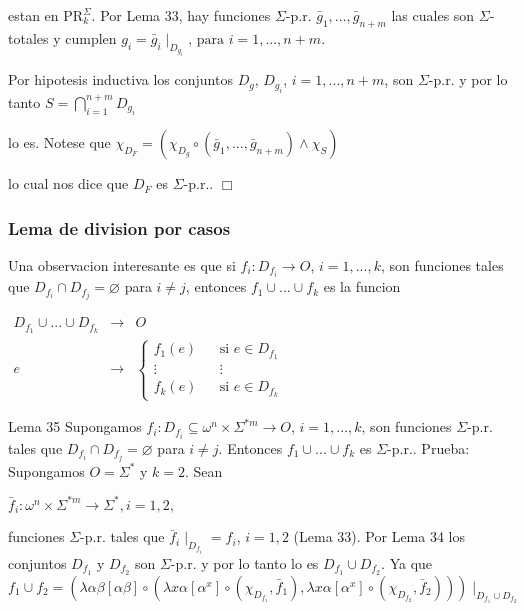 estan en \(\mathrm{PR}_{k}^{\Sigma }.\) Por Lema 33, hay funciones \(\Sigma \)-p.r. \(\bar{g}_{1},...,\bar{g}_{n+m}\) las cuales son \( \Sigma \)-totales y cumplen
\(\displaystyle g_{i}=\bar{g}_{i}\mid _{D_{g_{i}}}\text{, para }i=1,...,n+m. \)

Por hipotesis inductiva los conjuntos \(D_{g}\), \(D_{g_{i}}\), \(i=1,...,n+m\), son \(\Sigma \)-p.r. y por lo tanto
\(\displaystyle S=\bigcap_{i=1}^{n+m}D_{g_{i}} \)

lo es. Notese que
\(\displaystyle \chi _{D_{F}}=(\chi _{D_{g}}\circ \left( \bar{g}_{1},...,\bar{g} _{n+m}\right) \wedge \chi _{S}) \)

lo cual nos dice que \(D_{F}\) es \(\Sigma \)-p.r.. \(\Box\)

\subsubsection{Lema de division por casos}

Una observacion interesante es que si \(f_{i}:D_{f_{i}}\rightarrow O\), \( i=1,...,k\), son funciones tales que \(D_{f_{i}}\cap D_{f_{j}}=\varnothing \) para \(i\neq j\), entonces \(f_{1}\cup ...\cup f_{k}\) es la funcion

\(\displaystyle \begin{array}{rll} D_{f_{1}}\cup ...\cup D_{f_{k}} & \rightarrow & O \\ e & \rightarrow & \left\{ \begin{array}{clc} f_{1}(e) & & \text{si }e\in D_{f_{1}} \\ \vdots & & \vdots \\ f_{k}(e) & & \text{si }e\in D_{f_{k}} \end{array} \right. \end{array} \)


Lema 35 Supongamos \(f_{i}:D_{f_{i}}\subseteq \omega ^{n}\times \Sigma ^{\ast m}\rightarrow O\), \(i=1,...,k\), son funciones \(\Sigma \)-p.r. tales que \(D_{f_{i}}\cap D_{f_{j}}=\varnothing \) para \(i\neq j.\) Entonces \(f_{1}\cup ...\cup f_{k}\) es \(\Sigma \)-p.r..
Prueba: Supongamos \(O=\Sigma ^{\ast }\) y \(k=2.\) Sean

\(\displaystyle \bar{f}_{i}:\omega ^{n}\times \Sigma ^{\ast m}\rightarrow \Sigma ^{\ast },i=1,2, \)

funciones \(\Sigma \)-p.r. tales que \(\bar{f}_{i}\mid _{D_{f_{i}}}=f_{i}\), \( i=1,2\) (Lema 33)\(.\) Por Lema 34 los conjuntos \(D_{f_{1}}\) y \(D_{f_{2}}\) son \(\Sigma \)-p.r. y por lo tanto lo es \( D_{f_{1}}\cup D_{f_{2}}\). Ya que
\(\displaystyle f_{1}\cup f_{2}=\left( \lambda \alpha \beta \left[ \alpha \beta \right] \circ (\lambda x\alpha \left[ \alpha ^{x}\right] \circ (\chi _{D_{f_{1}}}, \bar{f}_{1}),\lambda x\alpha \left[ \alpha ^{x}\right] \circ (\chi _{D_{f_{2}}},\bar{f}_{2}))\right) \mid _{D_{f_{1}}\cup D_{f_{2}}} \)

